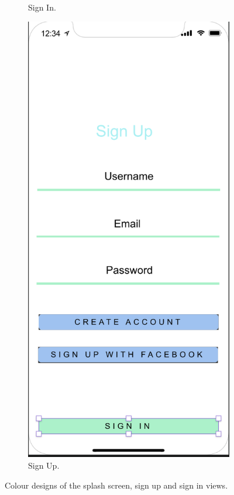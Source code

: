 \begin{figure}[H]
\begin{subfigure}[b]{0.3\textwidth}
        \caption{Sign In.}
        \label{fig:sign_in_colour}
    \end{subfigure}
    \hfill
    \begin{subfigure}[b]{0.3\textwidth}
        \centering
        \includegraphics[width=\textwidth]{./graphics/design/Sign Up Colour.png}
        \caption{Sign Up.}
        \label{fig:sign_up_colour}
    \end{subfigure}
    
    \caption{Colour designs of the splash screen, sign up and sign in views.}
    \label{fig:splash_signup_signin_colour}
\end{figure}

